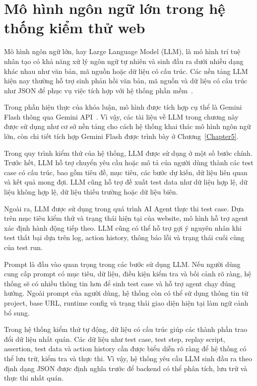 \section{Mô hình ngôn ngữ lớn trong hệ thống kiểm thử web}

Mô hình ngôn ngữ lớn, hay Large Language Model (LLM), là mô hình trí tuệ nhân tạo có khả năng xử lý ngôn ngữ tự nhiên và sinh đầu ra dưới nhiều dạng khác nhau như văn bản, mã nguồn hoặc dữ liệu có cấu trúc. Các nền tảng LLM hiện nay thường hỗ trợ sinh phản hồi văn bản, mã nguồn và dữ liệu có cấu trúc như JSON để phục vụ việc tích hợp với hệ thống phần mềm~\cite{openai_text_generation,openai_structured_outputs}.

Trong phần hiện thực của khóa luận, mô hình được tích hợp cụ thể là Gemini Flash thông qua Gemini API~\cite{GeminiAPI2026}. Vì vậy, các tài liệu về LLM trong chương này được sử dụng như cơ sở nền tảng cho cách hệ thống khai thác mô hình ngôn ngữ lớn, còn chi tiết tích hợp Gemini Flash được trình bày ở Chương~\ref{Chapter5}.

Trong quy trình kiểm thử của hệ thống, LLM được sử dụng ở một số bước chính. Trước hết, LLM hỗ trợ chuyển yêu cầu hoặc mô tả của người dùng thành các test case có cấu trúc, bao gồm tiêu đề, mục tiêu, các bước dự kiến, dữ liệu liên quan và kết quả mong đợi. LLM cũng hỗ trợ đề xuất test data như dữ liệu hợp lệ, dữ liệu không hợp lệ, dữ liệu thiếu trường hoặc dữ liệu biên.

Ngoài ra, LLM được sử dụng trong quá trình AI Agent thực thi test case. Dựa trên mục tiêu kiểm thử và trạng thái hiện tại của website, mô hình hỗ trợ agent xác định hành động tiếp theo. LLM cũng có thể hỗ trợ gợi ý nguyên nhân khi test thất bại dựa trên log, action history, thông báo lỗi và trạng thái cuối cùng của test run.

Prompt là đầu vào quan trọng trong các bước sử dụng LLM. Nếu người dùng cung cấp prompt có mục tiêu, dữ liệu, điều kiện kiểm tra và bối cảnh rõ ràng, hệ thống sẽ có nhiều thông tin hơn để sinh test case và hỗ trợ agent chạy đúng hướng. Ngoài prompt của người dùng, hệ thống còn có thể sử dụng thông tin từ project, base URL, runtime config và trạng thái giao diện hiện tại làm ngữ cảnh bổ sung.

Trong hệ thống kiểm thử tự động, dữ liệu có cấu trúc giúp các thành phần trao đổi dữ liệu nhất quán. Các dữ liệu như test case, test step, replay script, assertion, test data và action history cần được biểu diễn rõ ràng để hệ thống có thể lưu trữ, kiểm tra và thực thi. Vì vậy, hệ thống yêu cầu LLM sinh đầu ra theo định dạng JSON được định nghĩa trước để backend có thể phân tích, lưu trữ và thực thi nhất quán.

